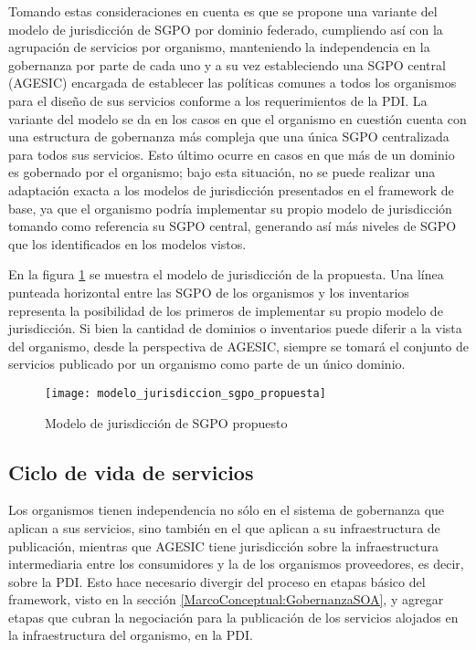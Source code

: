    Tomando estas consideraciones en cuenta es que se propone una variante del modelo de jurisdicción de SGPO por dominio federado, cumpliendo así con la agrupación de servicios por organismo, manteniendo la independencia en la gobernanza por parte de cada uno y a su vez estableciendo una SGPO central (AGESIC) encargada de establecer las políticas comunes a todos los organismos para el diseño de sus servicios conforme a los requerimientos de la PDI. La variante del modelo se da en los casos en que el organismo en cuestión cuenta con una estructura de gobernanza más compleja que una única SGPO centralizada para todos sus servicios. Esto último ocurre en casos en que más de un dominio es gobernado por el organismo; bajo esta situación, no se puede realizar una adaptación exacta a los modelos de jurisdicción presentados en el framework de base, ya que el organismo podría implementar su propio modelo de jurisdicción tomando como referencia su SGPO central, generando así más niveles de SGPO que los identificados en los modelos vistos.

    En la figura \ref{imagen:modelo_jurisdiccion_sgpo_propuesta} se muestra el modelo de jurisdicción de la propuesta. Una línea punteada horizontal entre las SGPO de los organismos y los inventarios representa la posibilidad de los primeros de implementar su propio modelo de jurisdicción. Si bien la cantidad de dominios o inventarios puede diferir a la vista del organismo, desde la perspectiva de AGESIC, siempre se tomará el conjunto de servicios publicado por un organismo como parte de un único dominio.

    \begin{figure}
      \centering
      \texttt{[image: modelo\_jurisdiccion\_sgpo\_propuesta]}
      \caption{Modelo de jurisdicción de SGPO propuesto}
      \label{imagen:modelo_jurisdiccion_sgpo_propuesta}
    \end{figure}

  \subsection{Ciclo de vida de servicios}
    \label{Solucion:Gobernanza:CicloDeVida}
    Los organismos tienen independencia no sólo en el sistema de gobernanza que aplican a sus servicios, sino también en el que aplican a su infraestructura de publicación, mientras que AGESIC tiene jurisdicción sobre la infraestructura intermediaria entre los consumidores y la de los organismos proveedores, es decir, sobre la PDI. Esto hace necesario divergir del proceso en etapas básico del framework, visto en la sección \ref{MarcoConceptual:GobernanzaSOA}, y agregar etapas que cubran la negociación para la publicación de los servicios alojados en la infraestructura del organismo, en la PDI.

